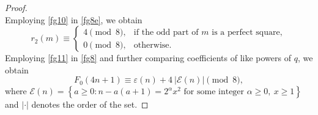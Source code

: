 \documentclass[10pt,a4paper]{amsart}
\begin{document}
\begin{proof}
\begin{equation}
\end{equation}
Employing \eqref{fg10} in \eqref{fg8e}, we obtain 
\begin{equation}\label{fg11}
r_2(m)\equiv
\begin{cases}
4 \pmod 8, & \text{if the odd part of }m\text{ is a perfect square},\\
0 \pmod 8, & \text{otherwise}.
\end{cases}
\end{equation}
Employing \eqref{fg11} in \eqref{fg8} and further comparing coefficients of like powers of $q$, we obtain
\begin{equation}\label{fg12}
F_0(4n+1)
\equiv
\varepsilon(n)+4~|\mathcal{E}(n)|
\pmod 8,
\end{equation}
where
$
\mathcal{E}(n)=
\left\{
a\geq0:
n-a(a+1)=2^\alpha x^2
\text{ for some integer } \alpha\geq0,\ x\geq1
\right\}
$ and $|\cdot|$ denotes the order of the set. 


\end{proof}
\end{document}
